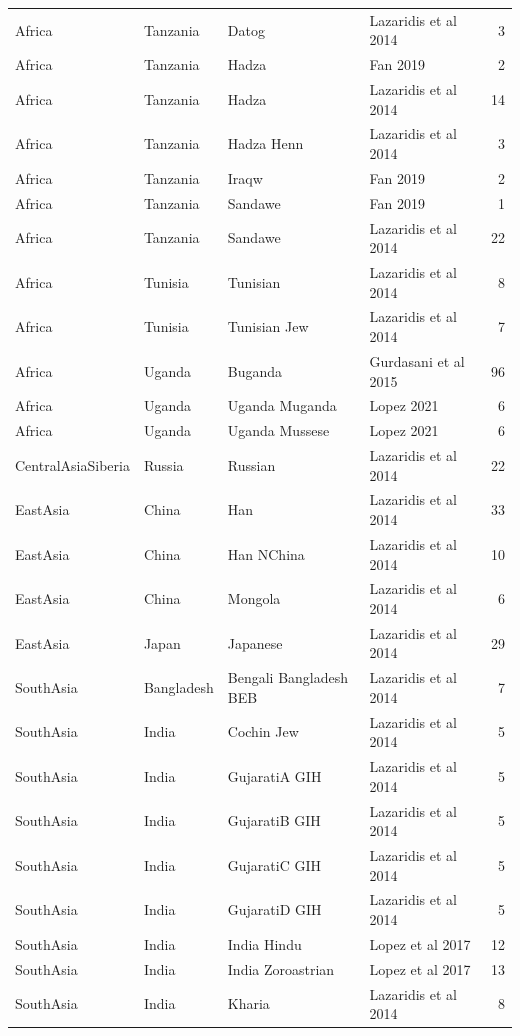 \begin{longtable}[t]{lll>{\raggedright\arraybackslash}p{9em}r}
Africa & Tanzania & Datog & Lazaridis et al 2014 & 3\\
\addlinespace
Africa & Tanzania & Hadza & Fan 2019 & 2\\
Africa & Tanzania & Hadza & Lazaridis et al 2014 & 14\\
Africa & Tanzania & Hadza Henn & Lazaridis et al 2014 & 3\\
Africa & Tanzania & Iraqw & Fan 2019 & 2\\
Africa & Tanzania & Sandawe & Fan 2019 & 1\\
\addlinespace
Africa & Tanzania & Sandawe & Lazaridis et al 2014 & 22\\
Africa & Tunisia & Tunisian & Lazaridis et al 2014 & 8\\
Africa & Tunisia & Tunisian Jew & Lazaridis et al 2014 & 7\\
Africa & Uganda & Buganda & Gurdasani et al 2015 & 96\\
Africa & Uganda & Uganda Muganda & Lopez 2021 & 6\\
\addlinespace
Africa & Uganda & Uganda Mussese & Lopez 2021 & 6\\
CentralAsiaSiberia & Russia & Russian & Lazaridis et al 2014 & 22\\
EastAsia & China & Han & Lazaridis et al 2014 & 33\\
EastAsia & China & Han NChina & Lazaridis et al 2014 & 10\\
EastAsia & China & Mongola & Lazaridis et al 2014 & 6\\
\addlinespace
EastAsia & Japan & Japanese & Lazaridis et al 2014 & 29\\
SouthAsia & Bangladesh & Bengali Bangladesh BEB & Lazaridis et al 2014 & 7\\
SouthAsia & India & Cochin Jew & Lazaridis et al 2014 & 5\\
SouthAsia & India & GujaratiA GIH & Lazaridis et al 2014 & 5\\
SouthAsia & India & GujaratiB GIH & Lazaridis et al 2014 & 5\\
\addlinespace
SouthAsia & India & GujaratiC GIH & Lazaridis et al 2014 & 5\\
SouthAsia & India & GujaratiD GIH & Lazaridis et al 2014 & 5\\
SouthAsia & India & India Hindu & Lopez et al 2017 & 12\\
SouthAsia & India & India Zoroastrian & Lopez et al 2017 & 13\\
SouthAsia & India & Kharia & Lazaridis et al 2014 & 8\\

\end{longtable}
